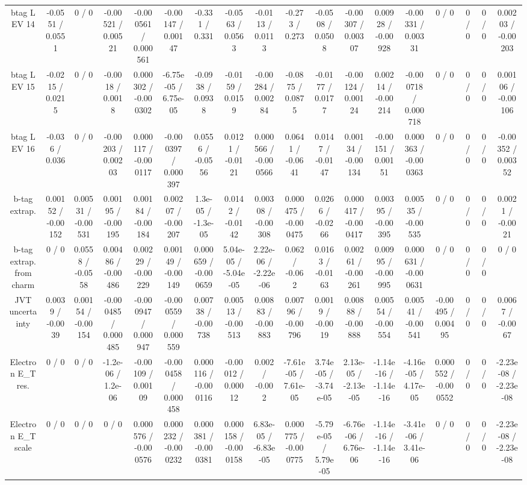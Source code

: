 \documentclass[10pt]{article}
\begin{document}
\begin{table}[htbp]
\begin{center}
\begin{tabular}{|c|c|c|c|c|c|c|c|c|c|c|c|c|c|c|c|c|c|}
  btag L EV 14 & -0.0551 / 0.0551 & 0 / 0 & -0.00521 / 0.00521 & -0.000561 / 0.000561 & -0.00147 / 0.00147 & -0.331 / 0.331 & -0.0563 / 0.0563 & -0.0113 / 0.0113 & -0.273 / 0.273 & -0.0508 / 0.0508 & -0.00307 / 0.00307 & 0.00928 / -0.00928 & -0.00331 / 0.00331 & 0 / 0 & 0 / 0 & 0 / 0 & 0.00203 / -0.00203 \\ 
  btag L EV 15 & -0.0215 / 0.0215 & 0 / 0 & -0.0018 / 0.0018 & 0.000302 / -0.000302 & -6.75e-05 / 6.75e-05 & -0.0938 / 0.0938 & -0.0159 / 0.0159 & -0.00284 / 0.00284 & -0.0875 / 0.0875 & -0.0177 / 0.0177 & -0.00124 / 0.00124 & 0.00214 / -0.00214 & -0.000718 / 0.000718 & 0 / 0 & 0 / 0 & 0 / 0 & 0.00106 / -0.00106 \\ 
  btag L EV 16 & -0.036 / 0.036 & 0 / 0 & -0.00203 / 0.00203 & 0.000117 / -0.000117 & -0.000397 / 0.000397 & 0.0556 / -0.0556 & 0.0121 / -0.0121 & 0.000566 / -0.000566 & 0.0641 / -0.0641 & 0.0147 / -0.0147 & 0.00134 / -0.00134 & -0.00151 / 0.00151 & 0.000363 / -0.000363 & 0 / 0 & 0 / 0 & 0 / 0 & -0.00352 / 0.00352 \\ 
  b-tag extrap. & 0.00152 / -0.00152 & 0.00531 / -0.00531 & 0.00195 / -0.00195 & 0.00184 / -0.00184 & 0.00207 / -0.00207 & 1.3e-05 / -1.3e-05 & 0.0142 / -0.0142 & 0.00308 / -0.00308 & 0.000475 / -0.000475 & 0.0266 / -0.0266 & 0.000417 / -0.000417 & 0.00395 / -0.00395 & 0.00535 / -0.00535 & 0 / 0 & 0 / 0 & 0 / 0 & 0.0021 / -0.0021 \\ 
  b-tag extrap. from charm & 0 / 0 & 0.0558 / -0.0558 & 0.00486 / -0.00486 & 0.00229 / -0.00229 & 0.00149 / -0.00149 & 0.000659 / -0.000659 & 5.04e-05 / -5.04e-05 & 2.22e-06 / -2.22e-06 & 0.062 / -0.062 & 0.0163 / -0.0163 & 0.00261 / -0.00261 & 0.00995 / -0.00995 & 0.000631 / -0.000631 & 0 / 0 & 0 / 0 & 0 / 0 & 0 / 0 \\ 
  JVT uncertainty & 0.0039 / -0.0039 & 0.00154 / -0.00154 & -0.000485 / 0.000485 & -0.000947 / 0.000947 & -0.000559 / 0.000559 & 0.00738 / -0.00738 & 0.00513 / -0.00513 & 0.00883 / -0.00883 & 0.00796 / -0.00796 & 0.0019 / -0.0019 & 0.00888 / -0.00888 & 0.00554 / -0.00554 & 0.00541 / -0.00541 & -0.00495 / 0.00495 & 0 / 0 & 0 / 0 & 0.0067 / -0.0067 \\ 
  Electron E_{T} res. & 0 / 0 & 0 / 0 & -1.2e-06 / 1.2e-06 & -0.00109 / 0.00109 & -0.000458 / 0.000458 & 0.000116 / -0.000116 & -0.00012 / 0.00012 & 0.002 / -0.002 & -7.61e-05 / 7.61e-05 & 3.74e-05 / -3.74e-05 & 2.13e-05 / -2.13e-05 & -1.14e-16 / -1.14e-16 & -4.16e-05 / 4.17e-05 & 0.000552 / -0.000552 & 0 / 0 & 0 / 0 & -2.23e-08 / -2.23e-08 \\ 
  Electron E_{T} scale & 0 / 0 & 0 / 0 & 0 / 0 & 0.000576 / -0.000576 & 0.000232 / -0.000232 & 0.000381 / -0.000381 & 0.000158 / -0.000158 & 6.83e-05 / -6.83e-05 & 0.000775 / -0.000775 & -5.79e-05 / 5.79e-05 & -6.76e-06 / 6.76e-06 & -1.14e-16 / -1.14e-16 & -3.41e-06 / 3.41e-06 & 0 / 0 & 0 / 0 & 0 / 0 & -2.23e-08 / -2.23e-08 \\ 

\end{tabular}
\end{center}
\end{table}
\end{document}
